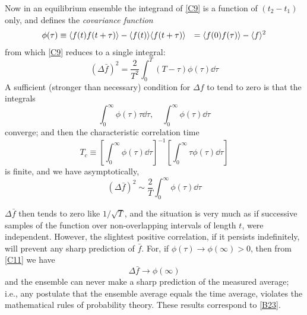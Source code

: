 Now in an equilibrium ensemble the integrand of \eqref{C9} is a function of $(t_2-t_1)$ only, and defines the \emph{covariance function}
\begin{equation}
	\label{C10}
	\begin{split}
	\phi(\tau)
		& \equiv \langle f(t) f(t+\tau)\rangle - \langle f(t)\rangle\langle f(t+\tau)\rangle
		&= \langle f(0) f(\tau)\rangle - \langle f\rangle^2
	\end{split}
\end{equation}
from which \eqref{C9} reduces to a single integral:
\begin{equation}
	\label{C11}
	(\Delta \bar{f})^2
		= \frac{2}{T^2} \int_{0}^{T} (T-\tau) \phi(\tau) \dd \tau
\end{equation}
A sufficient (stronger than necessary) condition for $\Delta f$ to tend to zero is that the integrals
\begin{equation}
	\label{C12}
	\int_{0}^{\infty} \phi(\tau) \tau \dd \tau, \quad \int_{0}^{\infty} \phi(\tau)\dd \tau
\end{equation}
converge; and then the characteristic correlation time
\begin{equation}
	\label{C13}
	T_c \equiv \left[\int_{0}^{\infty} \phi(\tau)\dd \tau\right]^{-1} \left[\int_{0}^{\infty} \tau \phi(\tau) \dd \tau\right]
\end{equation}
is finite, and we have asymptotically,
\begin{equation}
	\label{C14}
	(\Delta \bar{f})^2 \sim \frac{2}{T} \int_{0}^{\infty} \phi(\tau) \dd \tau
\end{equation}

$\Delta \bar{f}$ then tends to zero like $1/\sqrt{T}$, and the situation is very much as if successive samples of the function over non-overlapping intervals of length $t$, were independent.
However, the slightest positive correlation, if it persists indefinitely, will prevent any sharp prediction of $\bar{f}$.
For, if $\phi(\tau) \to \phi(\infty) > 0$, then from \eqref{C11} we have
\begin{equation}
	\Delta \bar{f} \to \phi(\infty)
\end{equation}
and the ensemble can never make a sharp prediction of the measured average; i.e., any postulate that the ensemble average equals the time average, violates the mathematical rules of probability theory.
These results correspond to \eqref{B23}.

